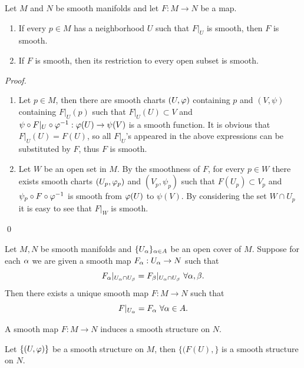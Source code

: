 \begin{proposition}
    Let $M$ and $N$ be smooth manifolds and let $F:M \to N$ be a map. 
    \begin{enumerate}
    \item If every $p \in M$ has a neighborhood $U$ such that $F|_U$ is smooth, then $F$ is smooth. 
    \item If $F$ is smooth, then its restriction to every open subset is smooth. 
    \end{enumerate}
\end{proposition}
\begin{proof}
    \begin{enumerate}
    \item Let $p \in M$, then there are smooth charts $(U,\varphi)$ containing $p$ and $(V,\psi)$ containing $F|_U(p)$ such that $F|_U(U) \subset V$ and 
    $\psi \circ F|_U \circ \varphi^{-1}: \varphi(U) \to \psi(V)$ 
    is a smooth function. It is obvious that $F|_U(U) = F(U)$, so all $F|_U$'s appeared in the above expressions can be substituted by $F$, thus $F$ is smooth. 
    \item Let $W$ be an open set in $M$. 
    By the smoothness of $F$, for every $p \in W$ there exists smooth charts $(U_p, \varphi_p)$ and $(V_p, \psi_p)$ such that $F(U_p) \subset V_p$ and $\psi_p \circ F \circ \varphi^{-1}$ is smooth from $\varphi(U)$ to $\psi(V)$.
    By considering the set $W \cap U_p$ it is easy to see that $F|_W$ is smooth. 
    \end{enumerate} \qed 
\end{proof}
\begin{theorem}
    Let $M,N$ be smooth manifolds and $\{U_\alpha\}_{\alpha \in A}$ be an open cover of $M$. Suppose for each $\alpha$ we are given a smooth map $F_\alpha:U_\alpha \to N$ such that 
    $$F_\alpha|_{U_\alpha \cap U_\beta} = F_\beta|_{U_\alpha \cap U_\beta}~\forall \alpha, \beta.$$
    Then there exists a unique smooth map $F:M \to N$ such that 
    $$F|_{U_\alpha} = F_\alpha~\forall \alpha \in A. $$
\end{theorem}

A smooth map $F:M \to N$ induces a smooth structure on $N$.
\begin{theorem}
    Let $\{(U, \varphi)\}$ be a smooth structure on $M$, then 
    $\{(F(U), \}$ is a smooth structure on $N$. 
\end{theorem}


